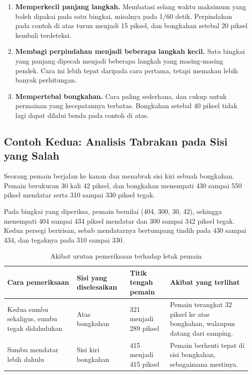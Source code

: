 \begin{enumerate}
  \item \textbf{Memperkecil panjang langkah.} Membatasi selang waktu maksimum
        yang boleh dipakai pada satu bingkai, misalnya pada 1/60 detik.
        Perpindahan pada contoh di atas turun menjadi 15 piksel, dan bongkahan
        setebal 20 piksel kembali terdeteksi.
  \item \textbf{Membagi perpindahan menjadi beberapa langkah kecil.} Satu
        bingkai yang panjang dipecah menjadi beberapa langkah yang
        masing-masing pendek. Cara ini lebih tepat daripada cara pertama,
        tetapi memakan lebih banyak perhitungan.
  \item \textbf{Mempertebal bongkahan.} Cara paling sederhana, dan cukup
        untuk permainan yang kecepatannya terbatas. Bongkahan setebal 40
        piksel tidak lagi dapat dilalui benda pada contoh di atas.
\end{enumerate}

\subsection{Contoh Kedua: Analisis Tabrakan pada Sisi yang Salah}

\begin{contohbox}
Seorang pemain berjalan ke kanan dan menabrak sisi kiri sebuah bongkahan.
Pemain berukuran 30 kali 42 piksel, dan bongkahan menempati 430 sampai 550
piksel mendatar serta 310 sampai 330 piksel tegak.

Pada bingkai yang diperiksa,  pemain bernilai (404, 300, 30, 42),
sehingga menempati 404 sampai 434 piksel mendatar dan 300 sampai 342 piksel
tegak. Kedua persegi beririsan, sebab mendatarnya bertumpang tindih pada 430
sampai 434, dan tegaknya pada 310 sampai 330.
\end{contohbox}

\begin{table}[htbp]
\centering
\caption{Akibat urutan pemeriksaan terhadap letak pemain}
\label{tab:sumbu-salah}
{\setlength{\tabcolsep}{4pt}\footnotesize%
\begin{tabularx}{\textwidth}{@{}L{4.4cm} C{2.6cm} C{2.6cm} Y@{}}
\toprule
\headrow \textbf{Cara pemeriksaan} & \textbf{Sisi yang diselesaikan} & \textbf{Titik tengah pemain} & \textbf{Akibat yang terlihat} \\
\midrule
Kedua sumbu sekaligus, sumbu tegak didahulukan &
Atas bongkahan & 321 menjadi 289 piksel &
Pemain terangkat 32 piksel ke atas bongkahan, walaupun datang dari samping. \\
\addlinespace
Sumbu mendatar lebih dahulu &
Sisi kiri bongkahan & 415 menjadi 415 piksel &
Pemain berhenti tepat di sisi bongkahan, sebagaimana mestinya. \\
\bottomrule
\end{tabularx}}
\end{table}

